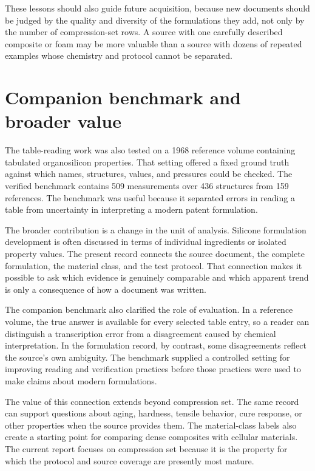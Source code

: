 \documentclass[10pt]{article}
\begin{document}
These lessons should also guide future acquisition, because new documents
should be judged by the quality and diversity of the formulations they add, not
only by the number of compression-set rows. A source with one carefully described
composite or foam may be more valuable than a source with dozens of repeated
examples whose chemistry and protocol cannot be separated.

\section{Companion benchmark and broader value}
The table-reading work was also tested on a 1968 reference volume containing
tabulated organosilicon properties. That setting offered a fixed ground truth
against which names, structures, values, and pressures could be checked. The
verified benchmark contains 509 measurements over 436 structures from 159
references. The benchmark was useful because it separated errors in reading a
table from uncertainty in interpreting a modern patent formulation.

The broader contribution is a change in the unit of analysis. Silicone
formulation development is often discussed in terms of individual ingredients
or isolated property values. The present record connects the source document,
the complete formulation, the material class, and the test protocol. That
connection makes it possible to ask which evidence is genuinely comparable
and which apparent trend is only a consequence of how a document was written.

The companion benchmark also clarified the role of evaluation. In a reference
volume, the true answer is available for every selected table entry, so a
reader can distinguish a transcription error from a disagreement caused by
chemical interpretation. In the formulation record, by contrast, some
disagreements reflect the source's own ambiguity. The benchmark supplied a
controlled setting for improving reading and verification practices before
those practices were used to make claims about modern formulations.

The value of this connection extends beyond compression set. The same record
can support questions about aging, hardness, tensile behavior, cure response,
or other properties when the source provides them. The material-class labels
also create a starting point for comparing dense composites with cellular
materials. The current report focuses on compression set because it is the
property for which the protocol and source coverage are presently most mature.
\end{document}
